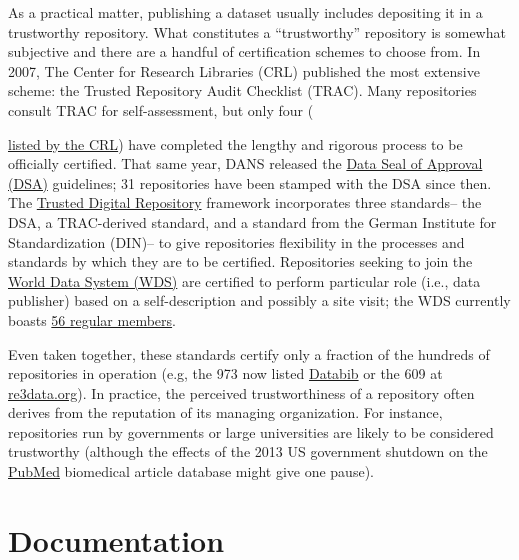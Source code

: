 \documentclass[10pt,a4paper,twocolumn]{article}
\begin{document}
{As a practical matter, publishing a dataset usually includes depositing it in a trustworthy repository.
What constitutes a ``trustworthy'' repository is somewhat subjective and there are a handful of certification schemes to choose from.
In 2007, The Center for Research Libraries (CRL) published the most extensive scheme: the Trusted Repository Audit Checklist (TRAC)\cite{dale_trustworthy_2007}.
Many repositories consult TRAC for self-assessment, but only four ({\href{http://www.crl.edu/archiving-preservation/digital-archives/metrics-assessing-and-certifying-0}{listed by the CRL}) have completed the lengthy and rigorous process to be officially certified.
That same year, DANS released the \href{http://datasealofapproval.org/}{Data Seal of Approval (DSA)} guidelines; 31 repositories have been stamped with the DSA since then.
The \href{http://www.trusteddigitalrepository.eu/}{Trusted Digital Repository} framework incorporates three standards-- the DSA, a TRAC-derived standard, and a  standard from the German Institute for Standardization (DIN)-- to give repositories flexibility in the processes and standards by which they are to be certified.
Repositories seeking to join the \href{https://www.icsu-wds.org/}{World Data System (WDS)} are certified to perform particular role (i.e., data publisher) based on a self-description and possibly a site visit; the WDS currently boasts \href{http://www.icsu-wds.org/community/membership/regular-members}{56 regular members}.

Even taken together, these standards certify only a fraction of the hundreds of repositories in operation (e.g, the 973 now listed \href{http://databib.org/}{Databib} or the 609 at \href{http://www.re3data.org/}{re3data.org}).
In practice, the perceived trustworthiness of a repository often derives from the reputation of its managing organization.
For instance, repositories run by governments or large universities are likely to be considered trustworthy (although the effects of the 2013 US government shutdown on the \href{http://www.ncbi.nlm.nih.gov/pubmed/}{PubMed} biomedical article database\cite{check_hayden_nih_2013} might give one pause).


\section*{Documentation}\label{documentation}

}}
\end{document}
